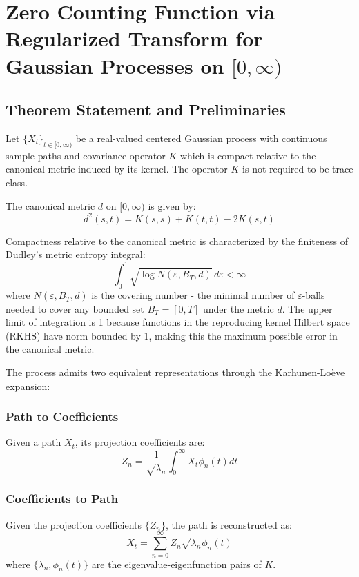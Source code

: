 \documentclass{article}
\begin{document}
\section{Zero Counting Function via Regularized Transform for Gaussian Processes on $[0,\infty)$}

\subsection{Theorem Statement and Preliminaries}
Let $\{X_t\}_{t\in[0,\infty)}$ be a real-valued centered Gaussian process with continuous sample paths and covariance operator $K$ which is compact relative to the canonical metric induced by its kernel. The operator $K$ is not required to be trace class. 

The canonical metric $d$ on $[0,\infty)$ is given by:
\begin{equation}
    d^2(s,t) = K(s,s) + K(t,t) - 2K(s,t)
\end{equation}

Compactness relative to the canonical metric is characterized by the finiteness of Dudley's metric entropy integral:
\begin{equation}
    \int_0^1 \sqrt{\log N(\varepsilon,B_T,d)} \, d\varepsilon < \infty
\end{equation}
where $N(\varepsilon,B_T,d)$ is the covering number - the minimal number of $\varepsilon$-balls needed to cover any bounded set $B_T = [0,T]$ under the metric $d$. The upper limit of integration is 1 because functions in the reproducing kernel Hilbert space (RKHS) have norm bounded by 1, making this the maximum possible error in the canonical metric.

The process admits two equivalent representations through the Karhunen-Loève expansion:

\subsubsection*{Path to Coefficients}
Given a path $X_t$, its projection coefficients are:
\begin{equation}
    Z_n = \frac{1}{\sqrt{\lambda_n}} \int_0^\infty X_t \phi_n(t) dt
\end{equation}

\subsubsection*{Coefficients to Path}
Given the projection coefficients $\{Z_n\}$, the path is reconstructed as:
\begin{equation}
    X_t = \sum_{n=0}^{\infty} Z_n \sqrt{\lambda_n} \phi_n(t)
\end{equation}
where $\{\lambda_n, \phi_n(t)\}$ are the eigenvalue-eigenfunction pairs of $K$.
\end{document}
